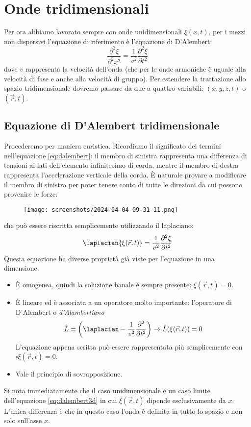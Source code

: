 \chapter{Onde tridimensionali}

Per ora abbiamo lavorato sempre con onde unidimensionali \(\xi (x,t)\), per i mezzi non dispersivi l'equazione di riferimento è l'equazione di D'Alembert:
\begin{equation}\label{eq:dalembert}
	\frac{\partial ^{2} \xi }{\partial ^{2} x^{2} }= \frac{1}{v^{2} }\frac{\partial ^{2} \xi }{\partial t ^{2} }  
\end{equation}
dove \(v\) rappresenta la velocità dell'onda (che per le onde armoniche è uguale alla velocità di fase e anche alla velocità di gruppo).
Per estendere la trattazione allo spazio tridimensionale dovremo passare da due a quattro variabili: \((x,y,z,t)\) o \((\vec{r} , t)\).
\section{Equazione di D'Alembert tridimensionale}
Procederemo per maniera euristica. Ricordiamo il significato dei termini nell'equazione \eqref{eq:dalembert}: il membro di sinistra rappresenta una differenza di tensioni ai lati dell'elemento infinitesimo di corda, mentre il membro di destra rappresenta l'accelerazione verticale della corda. È naturale provare a modificare il membro di sinistra per poter tenere conto di tutte le direzioni da cui possono provenire le forze:
\begin{figure}[H]
	\centering
	\texttt{[image: screenshots/2024-04-04-09-31-11.png]}
\end{figure}
\noindent che può essere riscritta semplicemente utilizzando il laplaciano:
\begin{equation} \label{eq:dalembert3d}
	\laplacian{\xi (\vec{r} , t)}= \frac{1}{v^{2} }\frac{\partial ^{2} \xi }{\partial t ^{2} } 
\end{equation}
Questa equazione ha diverse proprietà già viste per l'equazione in una dimensione:
\begin{itemize}
	\item È omogenea, quindi la soluzione banale è sempre presente: \(\xi (\vec{r} , t)=0\).
	\item È lineare ed è associata a un operatore molto importante: l'operatore di D'Alembert o \emph{d'Alambertiano}
	\[
		\hat{L} = \left( \laplacian - \frac{1}{v^{2} }\frac{\partial ^{2} }{\partial t ^{2} }  \right) \to \hat{L} (\xi (\vec{r} , t))=0
	\]
	L'equazione appena scritta può essere rappresentata più semplicemente con \(\square \xi (\vec{r} , t) = 0\).	
	\item Vale il principio di sovrapposizione.
\end{itemize}
Si nota immediatamente che il caso unidimensionale è un caso limite dell'equazione \eqref{eq:dalembert3d} in cui \(\xi (\vec{r} , t)\) dipende esclusivamente da \(x\). L'unica differenza è che in questo caso l'onda è definita in tutto lo spazio e non solo sull'asse \(x\).

